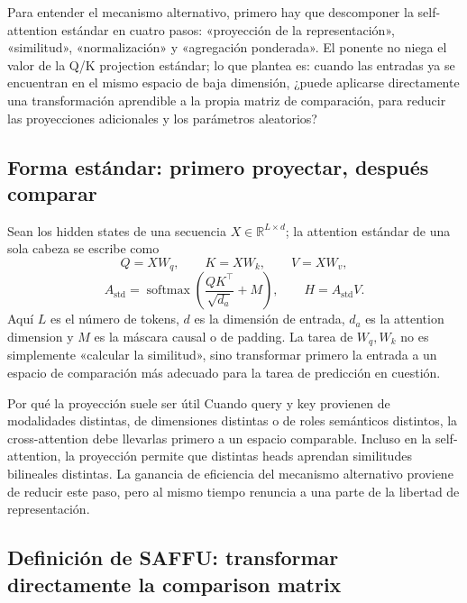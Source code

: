 \documentclass[a4paper]{article}
\begin{document}
Para entender el mecanismo alternativo, primero hay que descomponer la self-attention estándar en cuatro pasos: «proyección de la representación», «similitud», «normalización» y «agregación ponderada». El ponente no niega el valor de la Q/K projection estándar; lo que plantea es: cuando las entradas ya se encuentran en el mismo espacio de baja dimensión, ¿puede aplicarse directamente una transformación aprendible a la propia matriz de comparación, para reducir las proyecciones adicionales y los parámetros aleatorios?

\subsection{Forma estándar: primero proyectar, después comparar}

Sean los hidden states de una secuencia $X\in\mathbb{R}^{L\times d}$; la attention estándar de una sola cabeza se escribe como
\[
Q=XW_q,\qquad K=XW_k,\qquad V=XW_v,
\]
\[
A_{\text{std}}=\operatorname{softmax}\!\left(\frac{QK^\top}{\sqrt{d_a}}+M\right),
\qquad H=A_{\text{std}}V.
\]
Aquí $L$ es el número de tokens, $d$ es la dimensión de entrada, $d_a$ es la attention dimension y $M$ es la máscara causal o de padding. La tarea de $W_q,W_k$ no es simplemente «calcular la similitud», sino transformar primero la entrada a un espacio de comparación más adecuado para la tarea de predicción en cuestión.

\begin{knowledgebox}{Por qué la proyección suele ser útil}
Cuando query y key provienen de modalidades distintas, de dimensiones distintas o de roles semánticos distintos, la cross-attention debe llevarlas primero a un espacio comparable. Incluso en la self-attention, la proyección permite que distintas heads aprendan similitudes bilineales distintas. La ganancia de eficiencia del mecanismo alternativo proviene de reducir este paso, pero al mismo tiempo renuncia a una parte de la libertad de representación.
\end{knowledgebox}


\subsection{Definición de SAFFU: transformar directamente la comparison matrix}
\end{document}
